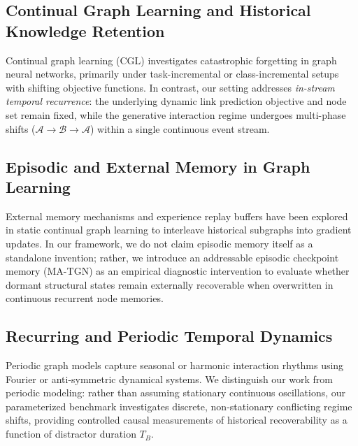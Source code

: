 \subsection{Continual Graph Learning and Historical Knowledge Retention}
Continual graph learning (CGL) \citep{kou2020continual, kirkpatrick2017overcoming} investigates catastrophic forgetting in graph neural networks, primarily under task-incremental or class-incremental setups with shifting objective functions. In contrast, our setting addresses \textit{in-stream temporal recurrence}: the underlying dynamic link prediction objective and node set remain fixed, while the generative interaction regime undergoes multi-phase shifts ($\mathcal{A} \to \mathcal{B} \to \mathcal{A}$) within a single continuous event stream.

\subsection{Episodic and External Memory in Graph Learning}
External memory mechanisms and experience replay buffers have been explored in static continual graph learning \citep{kou2020continual} to interleave historical subgraphs into gradient updates. In our framework, we do not claim episodic memory itself as a standalone invention; rather, we introduce an addressable episodic checkpoint memory (MA-TGN) as an empirical diagnostic intervention to evaluate whether dormant structural states remain externally recoverable when overwritten in continuous recurrent node memories.

\subsection{Recurring and Periodic Temporal Dynamics}
Periodic graph models \citep{gravina2023anti} capture seasonal or harmonic interaction rhythms using Fourier or anti-symmetric dynamical systems. We distinguish our work from periodic modeling: rather than assuming stationary continuous oscillations, our parameterized benchmark investigates discrete, non-stationary conflicting regime shifts, providing controlled causal measurements of historical recoverability as a function of distractor duration $T_B$.
